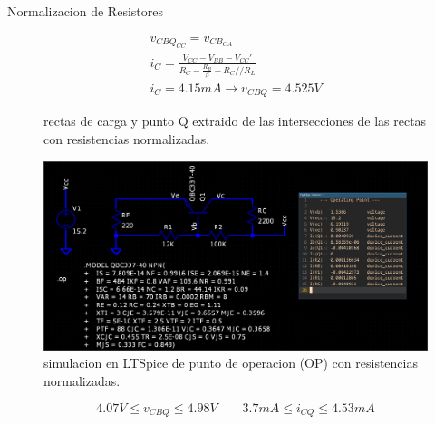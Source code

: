 \begin{frame}[allowframebreaks]{Normalizacion de Resistores}
\begin{figure}[!h]
\begin{minipage}{0.45\textwidth}
\begin{tikzpicture}
      \end{tikzpicture}
    \end{minipage}
    \hfill
    \begin{minipage}{0.45\textwidth}
      \begin{gather*}
        v_{CBQ_{CC}} = v_{CB_{CA}}\\[6pt]
        i_C = \frac{V_{CC} - V_{BB} - V_{CC}'}{R_C - \frac{R_B}{\beta} - R_C // R_L}\\[6pt]
        i_C = 4.15mA \to v_{CBQ} = 4.525V
      \end{gather*}
    \end{minipage}
    \caption{rectas de carga y punto Q extraido de las intersecciones de las rectas con resistencias normalizadas.}
  \end{figure}

  \begin{figure}[!ht]
    \centering
    \includegraphics[width=.9\textwidth]{images/sim_normalizada.png}
    \caption{simulacion en LTSpice de punto de operacion (OP) con resistencias normalizadas.}
  \end{figure}
  \begin{equation*}
    4.07V \leq v_{CBQ} \leq 4.98V \quad \quad 3.7mA \leq i_{CQ} \leq 4.53mA
  \end{equation*}
\end{frame}


